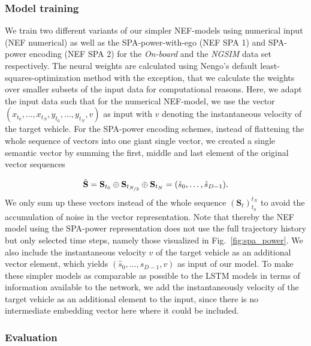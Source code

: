 \subsubsection{Model training}%
\label{ssubsec:model_training_nef}

We train two different variants of our simpler \ac{NEF}-models using numerical input (\acs{NEF} numerical) as well as the \ac{SPA}-power-with-ego (\acs{NEF} \acs{SPA} \num{1}) and \ac{SPA}-power encoding (\acs{NEF} \acs{SPA} \num{2}) for the \emph{On-board} and the \emph{\ac{NGSIM}} data set respectively.
The neural weights are calculated using \acs{Nengo}'s default least-squares-optimization method with the exception, that we calculate the weights over smaller subsets of the input data for computational reasons.
Here, we adapt the input data such that for the numerical \ac{NEF}-model, we use the vector $(x_{t_{0}}, \ldots, x_{t_{N}}, y_{t_{0}}, \ldots, y_{t_{N}}, v)$ as input with $v$ denoting the instantaneous velocity of the target vehicle.
For the \ac{SPA}-power encoding schemes, instead of flattening the whole sequence of vectors into one giant single vector, we created a single semantic vector by summing the first, middle and last element of the original vector sequences

\begin{equation}
  \hat{\mathbf{S}} =  \mathbf{S}_{t_0} \oplus \mathbf{S}_{t_{\nicefrac{N}{2}}} \oplus \mathbf{S}_{t_N} = (\hat{s}_0, \ldots, \hat{s}_{D-1}).
\end{equation}
We only sum up these vectors instead of the whole sequence $(\mathbf{S}_{t})_{t_0}^{t_N}$ to avoid the accumulation of noise in the vector representation.
Note that thereby the \ac{NEF} model using the \ac{SPA}-power representation does not use the full trajectory history but only selected time steps, namely those visualized in Fig.~\ref{fig:spa_power}.
We also include the instantaneous velocity $v$ of the target vehicle as an additional vector element, which yields $(\hat{s}_0, \ldots, \hat{s}_{D-1}, v)$ as input of our model.
To make these simpler models as comparable as possible to the \ac{LSTM} models in terms of information available to the network, we add the instantaneously velocity of the target vehicle as an additional element to the input, since there is no intermediate embedding vector here where it could be included.

\subsubsection{Evaluation}%
\label{ssubsec:evaluation_nef}

